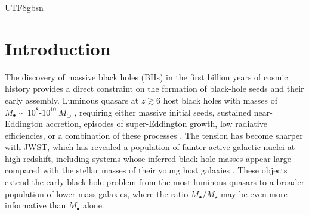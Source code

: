 \documentclass[trackchanges, twocolappendix, twocolumn]{aastex701}
\begin{document}
\begin{CJK*}{UTF8}{gbsn}

\section{Introduction} \label{sect:intro}

The discovery of massive black holes (BHs) in the first billion years of cosmic history provides a direct constraint on the formation of black-hole seeds and their early assembly. Luminous quasars at $z \gtrsim 6$ host black holes with masses of $M_{\bullet} \sim 10^8$-$10^{10}~M_\odot$ \citep[e.g.,][]{Banados+2018SMBH, Larson+2023SMBH, Kocevski+2023SMBH, Harikane+2023SMBH, Bogdan+2024SMBH, Furtak+2024SMBH}, requiring either massive initial seeds, sustained near-Eddington accretion, episodes of super-Eddington growth, low radiative efficiencies, or a combination of these processes \citep{Smith&Bromm+2019SMBH}. The tension has become sharper with JWST, which has revealed a population of fainter active galactic nuclei at high redshift, including systems whose inferred black-hole masses appear large compared with the stellar masses of their young host galaxies \citep[e.g.,][]{Maiolino+2024GN-z11&SMBH, Natarajan+2024UHZ1, Furtak+2024A2744QSO1}. These objects extend the early-black-hole problem from the most luminous quasars to a broader population of lower-mass galaxies, where the ratio $M_{\bullet} / M_\star$ may be even more informative than $M_{\bullet}$ alone.


\end{CJK*}
\end{document}
